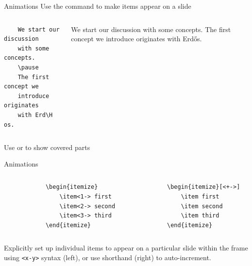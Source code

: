 \documentclass[xcolor=x11names, xcolor=table]{beamer}
\begin{document}
\begin{frame}[fragile]{Animations}
Use the \texttt{\pause} command to make items appear on a slide

\vspace{1em}
\begin{columns}
\begin{verbatim}
    We start our discussion
    with some concepts.
    \pause
    The first concept we
    introduce originates
    with Erd\H os.
\end{verbatim}
    \begin{overlayarea}{.9\textwidth}{5em}
    We start our discussion
    with some concepts.
    {
    The first concept we
    introduce originates
    with Erd\H os.
    }
    \end{overlayarea}
\end{columns}

\vspace{2em}
Use \texttt{} or
\texttt{} to show covered parts

\end{frame}


\begin{frame}[fragile]{Animations}
    \begin{columns}
        \begin{verbatim}
            \begin{itemize}
                \item<1-> first
                \item<2-> second
                \item<3-> third
            \end{itemize}
        \end{verbatim}
        \begin{verbatim}
            \begin{itemize}[<+->]
                \item first
                \item second
                \item third
            \end{itemize}
        \end{verbatim}
    \end{columns}

    \vspace{2em}
    Explicitly set up individual items to appear on a particular slide within
    the frame using \texttt{<x-y>} syntax (left), or use shorthand
    (right) to auto-increment.
\end{frame}
\end{document}
